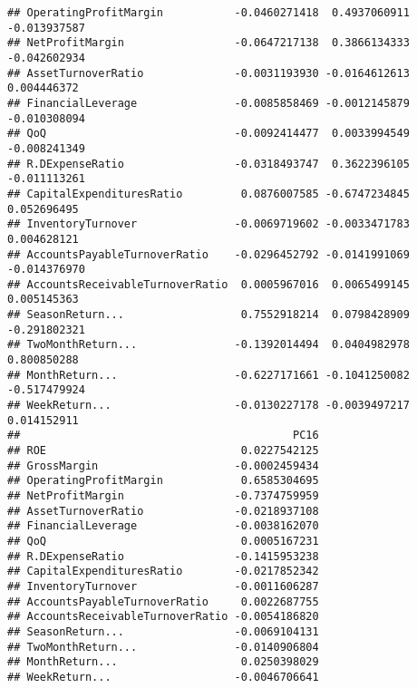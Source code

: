 \documentclass[
]{article}
\begin{document}
\begin{verbatim}
## OperatingProfitMargin           -0.0460271418  0.4937060911 -0.013937587
## NetProfitMargin                 -0.0647217138  0.3866134333 -0.042602934
## AssetTurnoverRatio              -0.0031193930 -0.0164612613  0.004446372
## FinancialLeverage               -0.0085858469 -0.0012145879 -0.010308094
## QoQ                             -0.0092414477  0.0033994549 -0.008241349
## R.DExpenseRatio                 -0.0318493747  0.3622396105 -0.011113261
## CapitalExpendituresRatio         0.0876007585 -0.6747234845  0.052696495
## InventoryTurnover               -0.0069719602 -0.0033471783  0.004628121
## AccountsPayableTurnoverRatio    -0.0296452792 -0.0141991069 -0.014376970
## AccountsReceivableTurnoverRatio  0.0005967016  0.0065499145  0.005145363
## SeasonReturn...                  0.7552918214  0.0798428909 -0.291802321
## TwoMonthReturn...               -0.1392014494  0.0404982978  0.800850288
## MonthReturn...                  -0.6227171661 -0.1041250082 -0.517479924
## WeekReturn...                   -0.0130227178 -0.0039497217  0.014152911
##                                          PC16
## ROE                              0.0227542125
## GrossMargin                     -0.0002459434
## OperatingProfitMargin            0.6585304695
## NetProfitMargin                 -0.7374759959
## AssetTurnoverRatio              -0.0218937108
## FinancialLeverage               -0.0038162070
## QoQ                              0.0005167231
## R.DExpenseRatio                 -0.1415953238
## CapitalExpendituresRatio        -0.0217852342
## InventoryTurnover               -0.0011606287
## AccountsPayableTurnoverRatio     0.0022687755
## AccountsReceivableTurnoverRatio -0.0054186820
## SeasonReturn...                 -0.0069104131
## TwoMonthReturn...               -0.0140906804
## MonthReturn...                   0.0250398029
## WeekReturn...                   -0.0046706641
\end{verbatim}
\end{document}
